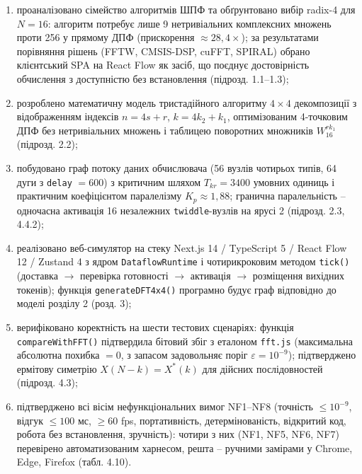 \documentclass[
]{article}
\newcommand{\passthrough}[1]{#1}
\begin{document}
\begin{enumerate}
\def\labelenumi{\arabic{enumi})}
\item
  проаналізовано сімейство алгоритмів ШПФ та обґрунтовано вибір radix-4
  для \(N = 16\): алгоритм потребує лише 9 нетривіальних комплексних
  множень проти 256 у прямому ДПФ (прискорення \(\approx 28,4 \times\));
  за результатами порівняння рішень (FFTW, CMSIS-DSP, cuFFT, SPIRAL)
  обрано клієнтський SPA на React Flow як засіб, що поєднує
  достовірність обчислення з доступністю без встановлення (підрозд.
  1.1--1.3);
\item
  розроблено математичну модель тристадійного алгоритму \(4 \times 4\)
  декомпозиції з відображенням індексів \(n = 4s + r\),
  \(k = 4k_{2} + k_{1}\), оптимізованим 4-точковим ДПФ без нетривіальних
  множень і таблицею поворотних множників \(W_{16}^{rk_{1}}\) (підрозд.
  2.2);
\item
  побудовано граф потоку даних обчислювача (56 вузлів чотирьох типів, 64
  дуги з \passthrough{\lstinline!delay!} \(= 600\)) з критичним шляхом
  \(T_{kr} = 3400\) умовних одиниць і практичним коефіцієнтом
  паралелізму \(K_{p} \approx 1,88\); гранична паралельність --
  одночасна активація 16 незалежних
  \passthrough{\lstinline!twiddle!}-вузлів на ярусі 2 (підрозд. 2.3,
  4.4.2);
\item
  реалізовано веб-симулятор на стеку Next.js 14 / TypeScript 5 / React
  Flow 12 / Zustand 4 з ядром \passthrough{\lstinline!DataflowRuntime!}
  і чотирикроковим методом \passthrough{\lstinline!tick()!} (доставка
  \(\rightarrow\) перевірка готовності \(\rightarrow\) активація
  \(\rightarrow\) розміщення вихідних токенів); функція
  \passthrough{\lstinline!generateDFT4x4()!} програмно будує граф
  відповідно до моделі розділу 2 (розд. 3);
\item
  верифіковано коректність на шести тестових сценаріях: функція
  \passthrough{\lstinline!compareWithFFT!}\passthrough{\lstinline!()!}
  підтвердила бітовий збіг з еталоном \passthrough{\lstinline!fft.js!}
  (максимальна абсолютна похибка \(= 0\), з запасом задовольняє поріг
  \(\varepsilon = 10^{- 9}\)); підтверджено ермітову симетрію
  \(X(N - k) = X^{*}(k)\) для дійсних послідовностей (підрозд. 4.3);
\item
  підтверджено всі вісім нефункціональних вимог NF1--NF8 (точність
  \(\leq 10^{- 9}\), відгук \(\leq 100\) мс, \(\geq 60\) fps,
  портативність, детермінованість, відкритий код, робота без
  встановлення, зручність): чотири з них (NF1, NF5, NF6, NF7) перевірено
  автоматизованим харнесом, решта -- ручними замірами у Chrome, Edge,
  Firefox (табл. 4.10).
\end{enumerate}
\end{document}
